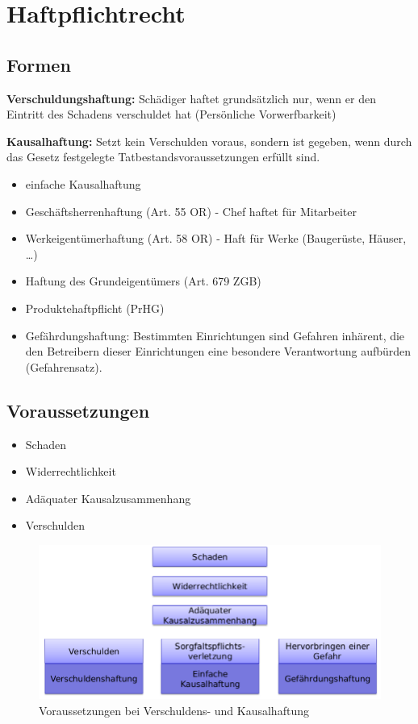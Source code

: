 \hypertarget{haftpflichtrecht}{%
\section{Haftpflichtrecht}\label{haftpflichtrecht}}

\hypertarget{formen}{%
\subsection{Formen}\label{formen}}

\textbf{Verschuldungshaftung:} Schädiger haftet grundsätzlich nur, wenn
er den Eintritt des Schadens verschuldet hat (Persönliche
Vorwerfbarkeit)

\textbf{Kausalhaftung:} Setzt kein Verschulden voraus, sondern ist
gegeben, wenn durch das Gesetz festgelegte Tatbestandsvoraussetzungen
erfüllt sind.

\begin{itemize}
\tightlist
\item
  einfache Kausalhaftung
\item
  Geschäftsherrenhaftung (Art. 55 OR) - Chef haftet für Mitarbeiter
\item
  Werkeigentümerhaftung (Art. 58 OR) - Haft für Werke (Baugerüste,
  Häuser, \ldots{})
\item
  Haftung des Grundeigentümers (Art. 679 ZGB)
\item
  Produktehaftpflicht (PrHG)
\item
  Gefährdungshaftung: Bestimmten Einrichtungen sind Gefahren inhärent,
  die den Betreibern dieser Einrichtungen eine besondere Verantwortung
  aufbürden (Gefahrensatz).
\end{itemize}

\hypertarget{voraussetzungen}{%
\subsection{Voraussetzungen}\label{voraussetzungen}}

\begin{itemize}
\tightlist
\item
  Schaden
\item
  Widerrechtlichkeit
\item
  Adäquater Kausalzusammenhang
\item
  Verschulden
\end{itemize}

\begin{figure}
\centering
\includegraphics{figures/haftpflichtVerschulden.png}
\caption{Voraussetzungen bei Verschuldens- und Kausalhaftung}
\end{figure}

